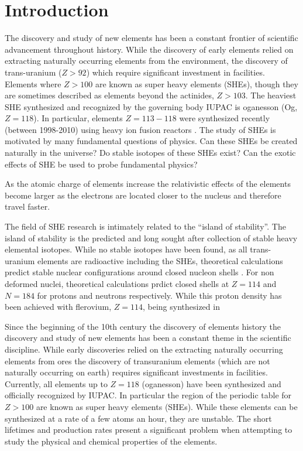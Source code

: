 \documentclass[10pt,a4paper, twoside, openright]{report}
\begin{document}
\chapter{Introduction} \label{chap:P2Intro}
The discovery and study of new elements has been a constant frontier of scientific advancement throughout history. While the discovery of early elements relied on extracting naturally occurring elements from the environment, the discovery of trans-uranium ($Z>92$) which require significant investment in facilities. Elements where $Z>100$ are known as super heavy elements (SHEs), though they are sometimes described as elements beyond the actinides, $Z>103$. The heaviest SHE synthesized and recognized by the governing body IUPAC is oganesson (Og, $Z=118$). In particular,  elements $Z=113-118$  were synthesized recently (between 1998-2010) using heavy ion fusion reactors \cite{Barber2011, Karol2016, Karol20162}.   The study of SHEs is motivated by many fundamental questions of physics. Can these SHEs be created naturally in the universe? Do stable isotopes of these SHEs exist? Can the exotic effects of SHE be used to probe fundamental physics? 

As the atomic charge of elements increase the relativistic effects of the elements become larger as the electrons are located closer to the nucleus and therefore travel faster.

The field of SHE research is intimately related to the ``island of stability''. The island of stability is the predicted and long sought after collection of stable heavy elemental isotopes. While no stable isotopes have been found, as all trans-uranium elements are radioactive including the SHEs, theoretical calculations predict stable nuclear configurations around closed nucleon shells \cite{Myers1966, Sobiczewski1966, Nilsson1969SHE, Nix1972}. For non deformed nuclei, theoretical calculations prdict closed shells at $Z=114$ and $N=184$ for protons and neutrons respectively. While this proton density has been achieved with flerovium, $Z=114$, being synthesized in  


Since the beginning of the 10th century the discovery of elements history the discovery and study of new elements has been a constant theme  in the scientific discipline. While early discoveries relied on the extracting naturally occurring elements from ores the discovery of transuranium elements (which are not naturally occurring on earth) requires significant investments in facilities. Currently, all elements up to $Z=118$ (oganesson) have been synthesized and officially recognized by IUPAC. In particular the region of the periodic table for $Z>100$ are known as super heavy elements (SHEs). While these elements can be synthesized at a rate of a few atoms an hour, they are unstable. The short lifetimes and production rates present a significant problem when attempting to study the physical and chemical properties of the elements. 
\end{document}
